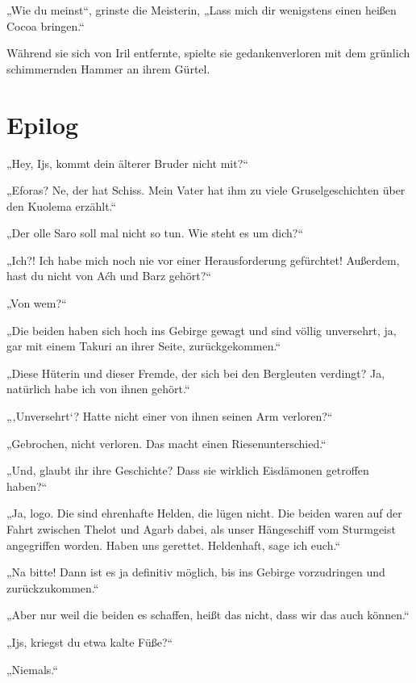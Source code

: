 „Wie du meinst“, grinste die Meisterin, „Lass mich dir wenigstens einen heißen Cocoa bringen.“

Während sie sich von Iril entfernte, spielte sie gedankenverloren mit dem grünlich schimmernden Hammer an ihrem Gürtel.






\newpage
\section{Epilog}


„Hey, Ijs, kommt dein älterer Bruder nicht mit?“

„Eforas? Ne, der hat Schiss. Mein Vater hat ihm zu viele Gruselgeschichten über den Kuolema erzählt.“

„Der olle Saro soll mal nicht so tun. Wie steht es um dich?“

„Ich?! Ich habe mich noch nie vor einer Herausforderung gefürchtet! Außerdem, hast du nicht von Aćh und Barz gehört?“

„Von wem?“

„Die beiden haben sich hoch ins Gebirge gewagt und sind völlig unversehrt, ja, gar mit einem Takuri an ihrer Seite, zurückgekommen.“

„Diese Hüterin und dieser Fremde, der sich bei den Bergleuten verdingt? Ja, natürlich habe ich von ihnen gehört.“

„‚Unversehrt‘? Hatte nicht einer von ihnen seinen Arm verloren?“

„Gebrochen, nicht verloren. Das macht einen Riesenunterschied.“

„Und, glaubt ihr ihre Geschichte? Dass sie wirklich Eisdämonen getroffen haben?“

„Ja, logo. Die sind ehrenhafte Helden, die lügen nicht. Die beiden waren auf der Fahrt zwischen Thelot und Agarb dabei, als unser Hängeschiff vom Sturmgeist angegriffen worden. Haben uns gerettet. Heldenhaft, sage ich euch.“

„Na bitte! Dann ist es ja definitiv möglich, bis ins Gebirge vorzudringen und zurückzukommen.“

„Aber nur weil die beiden es schaffen, heißt das nicht, dass wir das auch können.“

„Ijs, kriegst du etwa kalte Füße?“

„Niemals.“



\trennzeichen



